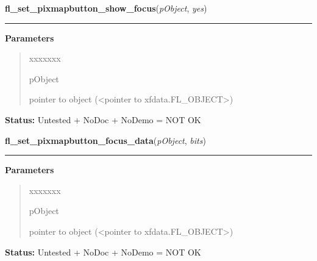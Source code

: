 \hspace{.8\funcindent}\begin{boxedminipage}{\funcwidth}

    \raggedright \textbf{fl\_set\_pixmapbutton\_show\_focus}(\textit{pObject}, \textit{yes})

    \vspace{-1.5ex}

    \rule{\textwidth}{0.5\fboxrule}
\setlength{\parskip}{2ex}
\setlength{\parskip}{1ex}
      \textbf{Parameters}
      \vspace{-1ex}

      \begin{quote}
        \begin{Ventry}{xxxxxxx}

          \item[pObject]

          pointer to object ({\textless}pointer to 
          xfdata.FL\_OBJECT{\textgreater})

        \end{Ventry}

      \end{quote}

\textbf{Status:} Untested + NoDoc + NoDemo = NOT OK



    \end{boxedminipage}

    \label{xformslib:library:fl_set_pixmapbutton_focus_data}

    \vspace{0.5ex}

\hspace{.8\funcindent}\begin{boxedminipage}{\funcwidth}

    \raggedright \textbf{fl\_set\_pixmapbutton\_focus\_data}(\textit{pObject}, \textit{bits})

    \vspace{-1.5ex}

    \rule{\textwidth}{0.5\fboxrule}
\setlength{\parskip}{2ex}
\setlength{\parskip}{1ex}
      \textbf{Parameters}
      \vspace{-1ex}

      \begin{quote}
        \begin{Ventry}{xxxxxxx}

          \item[pObject]

          pointer to object ({\textless}pointer to 
          xfdata.FL\_OBJECT{\textgreater})

        \end{Ventry}

      \end{quote}

\textbf{Status:} Untested + NoDoc + NoDemo = NOT OK



    \end{boxedminipage}

